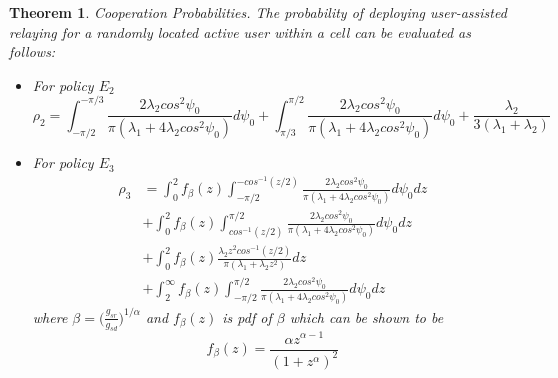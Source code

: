 \documentclass[titlepage]{article}
\newtheorem{thm}{Theorem}
\begin{document}
\begin{thm}{Cooperation Probabilities.}
The probability of
deploying user-assisted relaying for a randomly located active
user within a cell can be evaluated as follows:
\begin{itemize}
\item[i.] For policy $E_2$
\begin{equation}
\rho_2 = \int_{-\pi/2}^{-\pi/3}\frac{2\lambda_2 cos^2\psi_0}{\pi(\lambda_1+4\lambda_2cos^2\psi_0)}d\psi_0 + \int_{\pi/3}^{\pi/2}\frac{2\lambda_2 cos^2\psi_0}{\pi(\lambda_1+4\lambda_2cos^2\psi_0)}d\psi_0 + \frac{\lambda_2}{3(\lambda_1+\lambda_2)}
\end{equation}
\item[ii.] For policy $E_3$
\begin{align*}
\rho_3 &= \int_0^2 f_{\beta}(z)\int_{-\pi/2}^{-cos^{-1}(z/2)}\frac{2\lambda_2 cos^2\psi_0}{\pi(\lambda_1+4\lambda_2cos^2\psi_0)}d\psi_0 dz \\ 
&+ \int_0^2 f_{\beta}(z)\int^{\pi/2}_{cos^{-1}(z/2)}\frac{2\lambda_2 cos^2\psi_0}{\pi(\lambda_1+4\lambda_2cos^2\psi_0)}d\psi_0 dz \\ &+\int_0^2 f_{\beta}(z)\frac{\lambda_2 z^2 cos^{-1}(z/2)}{\pi(\lambda_1+\lambda_2z^2)}dz \\ 
&+ \int_2^{\infty} f_{\beta}(z)\int_{-\pi/2}^{\pi/2}\frac{2\lambda_2 cos^2\psi_0}{\pi(\lambda_1+4\lambda_2cos^2\psi_0)}d\psi_0 dz
\end{align*}
where $\beta = \bigg(\frac{g_{sr}}{g_{sd}}\bigg)^{1/\alpha}$ and $f_{\beta}(z)$ is pdf of $\beta$ which can be shown to be 
\begin{equation}
f_{\beta}(z) = \frac{\alpha z^{\alpha-1}}{(1+z^{\alpha})^2}
\end{equation}
\end{itemize}
\end{thm}
\end{document}
